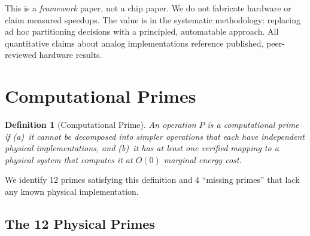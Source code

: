 \documentclass[11pt]{article}
\newtheorem{definition}{Definition}
\begin{document}
This is a \textit{framework} paper, not a chip paper. We do not fabricate hardware or claim measured speedups. The value is in the systematic methodology: replacing ad hoc partitioning decisions with a principled, automatable approach. All quantitative claims about analog implementations reference published, peer-reviewed hardware results.

\section{Computational Primes}
\label{sec:primes}

\begin{definition}[Computational Prime]
An operation $P$ is a computational prime if (a)~it cannot be decomposed into simpler operations that each have independent physical implementations, and (b)~it has at least one verified mapping to a physical system that computes it at $O(0)$ marginal energy cost.
\end{definition}

We identify 12 primes satisfying this definition and 4 ``missing primes'' that lack any known physical implementation.

\subsection{The 12 Physical Primes}
\end{document}
